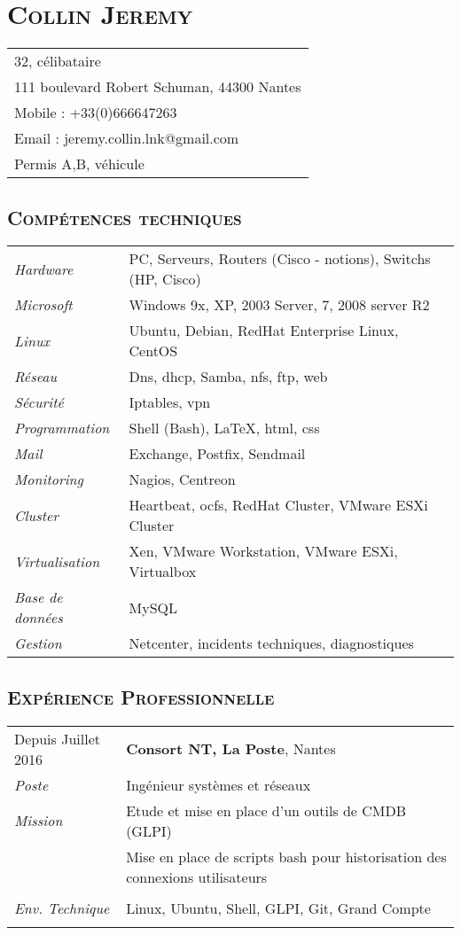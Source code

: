 \documentclass[a4paper,8pt]{article}
\newcommand{\hsection}[1]{\section*{\fontfamily{phv}\selectfont\textsc{#1}}}
\newcommand{\hsubsection}[1]{\subsection*{\fontfamily{phv}\selectfont\textsc{#1}}}
\begin{document}
\selectfont
\hsection{Collin Jeremy}
\begin{tabular}{p{16.5cm}}
\hline
32, célibataire\\
111 boulevard Robert Schuman, 44300 Nantes\\
Mobile : +33(0)666647263\\
Email : jeremy.collin.lnk@gmail.com\\
Permis A,B, véhicule\\
\end{tabular}

\hsubsection{Compétences techniques}
\begin{tabular}{P{3.5cm}|p{13cm}}
\textsl{Hardware}		& PC, Serveurs, Routers (Cisco - notions), Switchs (HP, Cisco)\\
\textsl{Microsoft}		& Windows 9x, XP, 2003 Server, 7, 2008 server R2\\
\textsl{Linux}			& Ubuntu, Debian, RedHat Enterprise Linux, CentOS\\
\textsl{Réseau}			& Dns, dhcp, Samba, nfs, ftp, web\\
\textsl{Sécurité}		& Iptables, vpn\\
\textsl{Programmation}		& Shell (Bash), \LaTeX, html, css\\
\textsl{Mail}			& Exchange, Postfix, Sendmail\\
\textsl{Monitoring}		& Nagios, Centreon\\
\textsl{Cluster}		& Heartbeat, ocfs, RedHat Cluster, VMware ESXi Cluster\\
\textsl{Virtualisation}		& Xen, VMware Workstation, VMware ESXi, Virtualbox\\
\textsl{Base de données}	& MySQL\\
\textsl{Gestion}		& Netcenter, incidents techniques, diagnostiques\\
\end{tabular}

\hsubsection{Expérience Professionnelle}
\begin{tabular}{P{3.5cm}|p{13cm}}
Depuis Juillet 2016		& \textbf{Consort NT, La Poste}, Nantes\\
\textsl{Poste}			& Ingénieur systèmes et réseaux\\
\textsl{Mission}		& Etude et mise en place d'un outils de CMDB (GLPI)\\
				& Mise en place de scripts bash pour historisation des connexions utilisateurs\\
				& \\
\textsl{Env. Technique}		& Linux, Ubuntu, Shell, GLPI, Git, Grand Compte \\
 & \\
\end{tabular}
\end{document}
